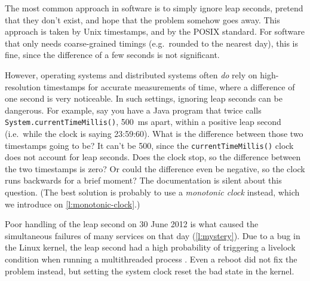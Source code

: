 The most common approach in software is to simply ignore leap seconds, pretend that they don't exist, and hope that the problem somehow goes away.
This approach is taken by Unix timestamps, and by the POSIX standard.
For software that only needs coarse-grained timings (e.g.\ rounded to the nearest day), this is fine, since the difference of a few seconds is not significant.

However, operating systems and distributed systems often \emph{do} rely on high-resolution timestamps for accurate measurements of time, where a difference of one second is very noticeable.
In such settings, ignoring leap seconds can be dangerous.
For example, say you have a Java program that twice calls \verb|System.currentTimeMillis()|, 500~ms apart, within a positive leap second (i.e.\ while the clock is saying 23:59:60).
What is the difference between those two timestamps going to be?
It can't be 500, since the \verb|currentTimeMillis()| clock does not account for leap seconds.
Does the clock stop, so the difference between the two timestamps is zero?
Or could the difference even be negative, so the clock runs backwards for a brief moment?
The documentation is silent about this question.
(The best solution is probably to use a \emph{monotonic clock} instead, which we introduce on \autoref{l:monotonic-clock}.)

Poor handling of the leap second on 30 June 2012 is what caused the simultaneous failures of many services on that day (\autoref{l:mystery}).
Due to a bug in the Linux kernel, the leap second had a high probability of triggering a livelock condition when running a multithreaded process \citep{Allen:2013,Minar:2012}.
Even a reboot did not fix the problem instead, but setting the system clock reset the bad state in the kernel.

